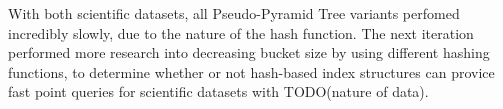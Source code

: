 With both scientific datasets, all Pseudo-Pyramid Tree variants perfomed incredibly slowly, due to the nature of the hash function. The next iteration performed more research into decreasing bucket size by using different hashing functions, to determine whether or not hash-based index structures can provice fast point queries for scientific datasets with TODO(nature of data).